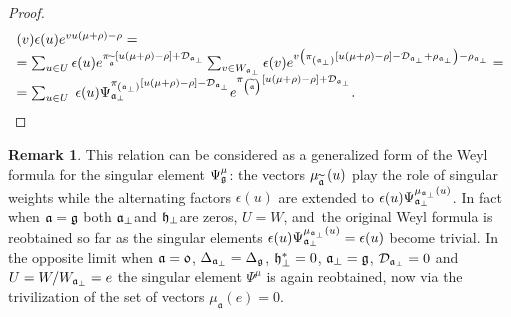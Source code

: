 \documentclass[12pt]{article}
\theoremstyle{definition}
\newtheorem{remark}{Remark}
\newcommand{\af}{\mathfrak{a}}
\newcommand{\aft}{\widetilde{\mathfrak{a}}}
\begin{document}
\begin{proof}
\begin{equation}
\begin{array}{l}
(v)\epsilon (u)e^{vu(\mu +\rho )-\rho }= \\
=\sum_{u\in U}\epsilon (u)e^{\pi _{\aft}\left[ u(\mu +\rho )-\rho \right]
+\mathcal{D}_{\frak{a}_{\perp }}}\sum_{v\in W_{\frak{a}_{\perp }}}\epsilon
(v)e^{v\left( \pi _{\left( \frak{a}_{\perp }\right) }\left[
u(\mu +\rho )-\rho \right] -\mathcal{D}_{\frak{a}_{\perp }}+\rho _{\frak{a}%
_{\perp }}\right) -\rho _{\frak{a}_{\perp }}}= \\
=\sum_{u\in U}\;\epsilon (u)\Psi _{\af_{\perp }}^{\pi
_{\left( \frak{a}_{\perp }\right) }\left[ u(\mu +\rho )-\rho
\right] -\mathcal{D}_{\frak{a}_{\perp }}}e^{\pi _{\left( \aft\right) }%
\left[ u(\mu +\rho )-\rho \right] +\mathcal{D}_{\frak{a}_{\perp }}}.
\end{array}
\label{singular main}
\end{equation}
\end{proof}

\bigskip

\begin{remark}
This relation can be considered as a generalized form of the Weyl formula
for the singular element $\Psi _{\frak{g}}^{\mu }$: the vectors $\mu _{%
\widetilde{\mathfrak{a}}}\left( u\right) $ play the role of singular weights
while the alternating factors $\epsilon (u)$ are extended to $\epsilon
(u)\Psi _{\frak{a}_{\perp }}^{\mu _{\frak{a}_{\perp }}\left( u\right) }$. In
fact when $\frak{a=g}$ both $\frak{a}_{\perp }$and $\frak{h}_{\perp }$are
zeros, $U=W$, and\ the original Weyl formula is reobtained so far as the singular elements $\epsilon (u)\Psi _{\frak{a}_{\perp
}}^{\mu _{\frak{a}_{\perp }}\left( u\right) }=\epsilon (u)$ become trivial.
 In the opposite
limit when $\frak{a=0}$, $\Delta _{\frak{a}_{\perp }}=\Delta _{\frak{g}}$, $%
\frak{h}_{\perp }^{\ast }=0$, $\frak{a}_{\perp }=\frak{g}$, $\mathcal{D}_{%
\frak{a}_{\perp }}=0$ and $U=W/W_{\frak{a}_{\perp }}=e$ the singular element
 $\Psi ^{\mu }$ is again reobtained, now via the trivilization of the set of
 vectors $\mu _{\af}\left( e\right) =0$.
\end{remark}
\end{document}
